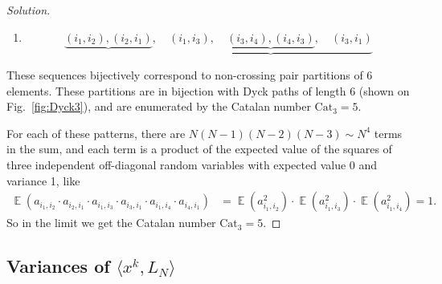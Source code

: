 \documentclass[letterpaper,11pt,oneside,reqno]{amsart}
\numberwithin{equation}{section}
\DeclareMathOperator{\EE}{\mathbb{E}}
\theoremstyle{definition}
\begin{document}
\begin{proof}[Solution]
\begin{enumerate}
	\item
	\begin{equation*}
	\underbrace{ ( i_1, i_2 ) , ( i_2 , i_1 ) } , \quad \underbrace{ ( i_1, i_3 ) , \quad \underbrace{ ( i_3, i_4 ) , ( i_4, i_3 ) } , \quad ( i_3, i_1 ) }
	\end{equation*}

	\end{enumerate}

	These sequences bijectively correspond to non-crossing pair partitions of 6 elements.
	These partitions are in bijection with Dyck paths of length 6
	(shown on Fig.~\ref{fig:Dyck3}), and are enumerated by the Catalan number $\mathrm{Cat}_3=5$.

	For each of these patterns, there are $ N ( N - 1 ) ( N - 2 ) ( N - 3 ) \sim N^4 $ terms in the sum, and each term is a product of the expected value of the squares of three independent off-diagonal random variables with expected value 0 and variance 1, like
	\begin{align*}
	\EE ( a_{ i_1, i_2 } \cdot a_{ i_2 , i_1 } \cdot a_{ i_1, i_3 } \cdot a_{ i_3, i_1 } \cdot a_{ i_1, i_4 } \cdot a_{ i_4, i_1 } ) &= \EE( a_{ i_1, i_2 }^2 ) \cdot \EE( a_{ i_1, i_3 }^2 ) \cdot \EE( a_{ i_1, i_4 }^2 ) = 1.
	\end{align*}
	So in the limit we get the Catalan number $ \mathrm{Cat}_3 = 5 $.
\end{proof}


\subsection{Variances of $\langle x^k,L_N\rangle$} %
\label{sub:variances_langle_x_k_l_nrangleto0_}
\end{document}
